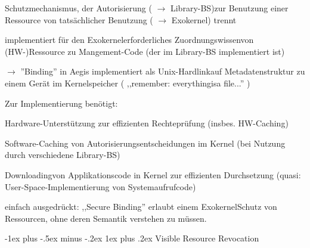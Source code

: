 \documentclass[a4paper]{article}
\makeatletter
\renewcommand{\subsubsection}{\@startsection{subsubsection}{3}{0mm}%
 {-1ex plus -.5ex minus -.2ex}%
 {1ex plus .2ex}%
 {\normalfont\small\bfseries}}
\makeatother
\begin{document}
\begin{multicols}{3}
    \begin{itemize*}
        \item Schutzmechanismus, der Autorisierung ( $\rightarrow$
        Library-BS)zur Benutzung einer Ressource von tatsächlicher Benutzung
        ( $\rightarrow$ Exokernel) trennt
        \item implementiert für den Exokernelerforderliches Zuordnungswissenvon
        (HW-)Ressource zu Mangement-Code (der im Library-BS implementiert ist)
        \item $\rightarrow$ ''Binding'' in Aegis implementiert als
        Unix-Hardlinkauf Metadatenstruktur zu einem Gerät im Kernelspeicher (
        ,,remember: everythingisa file...'' )
        \item Zur Implementierung benötigt:
        \begin{itemize*}
            \item Hardware-Unterstützung zur effizienten Rechteprüfung (insbes. HW-Caching)
            \item Software-Caching von Autorisierungsentscheidungen im Kernel (bei Nutzung durch verschiedene Library-BS)
            \item Downloadingvon Applikationscode in Kernel zur effizienten Durchsetzung (quasi: User-Space-Implementierung von Systemaufrufcode)
        \end{itemize*}
        \item einfach ausgedrückt: ,,Secure Binding'' erlaubt einem ExokernelSchutz
        von Ressourcen, ohne deren Semantik verstehen zu müssen.
    \end{itemize*}


    \subsubsection{Visible Resource
        Revocation}


\end{multicols}
\end{document}
